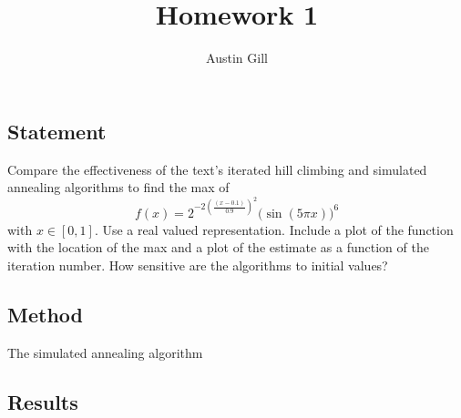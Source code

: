 \documentclass{article}
\title{Homework 1}
\author{Austin Gill}
\begin{document}
\maketitle


\section{}\label{prob:1}

\subsection{Statement}
Compare the effectiveness of the text's iterated hill climbing and simulated annealing algorithms to
find the max of
\[ f(x) = 2^{-2{\left(\frac{(x - 0.1)}{0.9}\right)}^2}{\big(\sin(5\pi x)\big)}^6\]
with $x\in [0,1]$. Use a real valued representation. Include a plot of the function with the
location of the max and a plot of the estimate as a function of the iteration number. How sensitive
are the algorithms to initial values?
\subsection{Method}

\begin{algorithm}[H]
    \begin{algorithmic}
        \EndIf{}
        \EndWhile{}
    \end{algorithmic}
    \caption{The simulated annealing algorithm}\label{alg:simulated-annealing}
\end{algorithm}


\subsection{Results}
\end{document}
